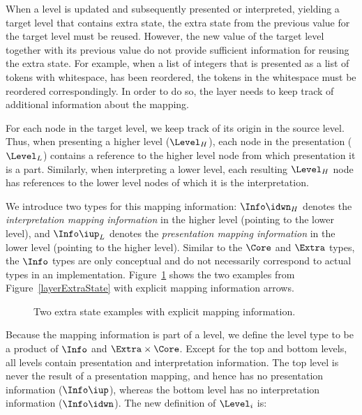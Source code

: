 When a level is updated and subsequently presented or interpreted, yielding a target level that contains extra state, the extra state from the previous value for the target level must be reused. However, the new value of the target level together with its previous value do not provide sufficient information for reusing the extra state. For example, when a list of integers that is presented as a list of tokens with whitespace, has been reordered, the tokens in the whitespace must be reordered correspondingly.  In order to do so, the layer needs to keep track of additional information about the mapping.

For each node in the target level, we keep track of its origin in the source level. Thus, when presenting a higher level ($\Level_{H}$), each node in the presentation ($\Level_{L}$) contains a reference to the higher level node from which presentation it is a part.  Similarly, when interpreting a lower level, each resulting $\Level_{H}$ node has references to the lower level nodes of which it is the interpretation. 

We introduce two types for this mapping information: $\Info\idwn_{H}$ denotes the {\em interpretation mapping information} in the higher level (pointing to the lower level), and $\Info\iup_{L}$ denotes the {\em presentation mapping information} in the lower level (pointing to the higher level). Similar to the $\Core$ and $\Extra$ types, the $\Info$ types are only conceptual and do not necessarily correspond to actual types in an implementation. Figure~\ref{coreExtraInfoExamples} shows the two examples from Figure~\ref{layerExtraState} with explicit mapping information arrows. 

\begin{figure}
\begin{center}
\begin{center}
\end{center}
\caption{Two extra state examples with explicit mapping information.}\label{coreExtraInfoExamples} 
\end{center}
\end{figure}

Because the mapping information is part of a level, we define the level type to be a product of $\Info$ and 
$\Extra \times \Core$. Except for the top and bottom levels, all levels contain presentation and interpretation information. The top level is never the result of a presentation mapping, and hence has no presentation information ($\Info\iup$), whereas the bottom level has no interpretation information ($\Info\idwn$). The new definition of $\Level_i$ is:

